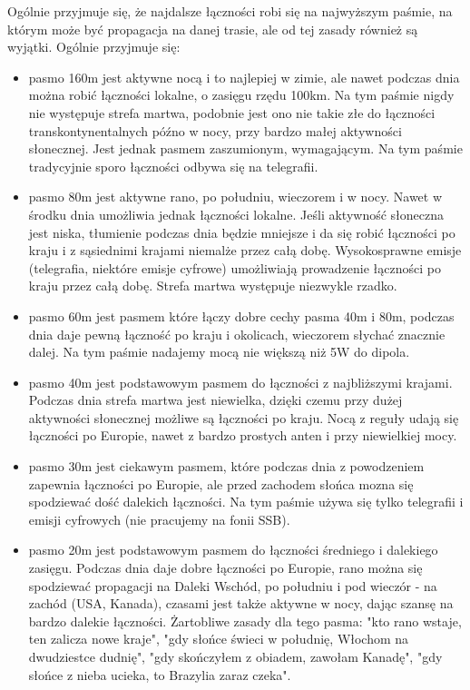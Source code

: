 \documentclass[a4paper,12pt]{article}
\begin{document}
Ogólnie przyjmuje się, że najdalsze łączności robi się na najwyższym paśmie, na którym może być propagacja na danej trasie, ale od tej zasady również są wyjątki. Ogólnie przyjmuje się:
\begin{itemize}
 \item pasmo 160m jest aktywne nocą i to najlepiej w zimie, ale nawet podczas dnia można robić łączności lokalne, o zasięgu rzędu 100km. Na tym paśmie nigdy nie występuje strefa martwa, podobnie jest ono nie takie złe do łączności transkontynentalnych późno w nocy, przy bardzo małej aktywności słonecznej. Jest jednak pasmem zaszumionym, wymagającym. Na tym paśmie tradycyjnie sporo łączności odbywa się na telegrafii.
 \item pasmo 80m jest aktywne rano, po południu, wieczorem i w nocy. Nawet w środku dnia umożliwia jednak łączności lokalne. Jeśli aktywność słoneczna jest niska, tłumienie podczas dnia będzie mniejsze i da się robić łączności po kraju i z sąsiednimi krajami niemalże przez całą dobę. Wysokosprawne emisje (telegrafia, niektóre emisje cyfrowe) umożliwiają prowadzenie łączności po kraju przez całą dobę. Strefa martwa występuje niezwykle rzadko.
\item pasmo 60m jest pasmem które łączy dobre cechy pasma 40m i 80m, podczas dnia daje pewną łączność po kraju i okolicach, wieczorem słychać znacznie dalej. Na tym paśmie nadajemy mocą nie większą niż 5W do dipola.
\item pasmo 40m jest podstawowym pasmem do łączności z najbliższymi krajami. Podczas dnia strefa martwa jest niewielka, dzięki czemu przy dużej aktywności słonecznej możliwe są łączności po kraju. Nocą z reguły udają się łączności po Europie, nawet z bardzo prostych anten i przy niewielkiej mocy.
 \item pasmo 30m jest ciekawym pasmem, które podczas dnia z powodzeniem zapewnia łączności po Europie, ale przed zachodem słońca mozna się spodziewać dość dalekich łączności. Na tym paśmie używa się tylko telegrafii i emisji cyfrowych (nie pracujemy na fonii SSB).
 \item pasmo 20m jest podstawowym pasmem do łączności średniego i dalekiego zasięgu. Podczas dnia daje dobre łączności po Europie, rano można się spodziewać propagacji na Daleki Wschód, po południu i pod wieczór - na zachód (USA, Kanada), czasami jest także aktywne w nocy, dając szansę na bardzo dalekie łączności. Żartobliwe zasady dla tego pasma: "kto rano wstaje, ten zalicza nowe kraje", "gdy słońce świeci w południę, Włochom na dwudziestce dudnię", "gdy skończyłem z obiadem, zawołam Kanadę", "gdy słońce z nieba ucieka, to Brazylia zaraz czeka".

\end{itemize}
\end{document}
